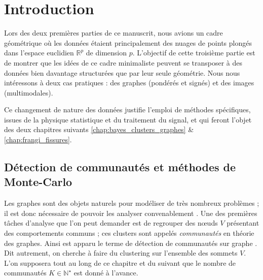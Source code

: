 \chapter{Introduction}
\label{chap:introduction_partie_III}

Lors des deux premières parties de ce manuscrit, nous avions un cadre géométrique où les données étaient principalement des nuages de points plongés dans l'espace euclidien $\mathbb R^p$ de dimension $p$. 
L'objectif de cette troisième partie est de montrer que les idées de ce cadre minimaliste peuvent se transposer à des données bien davantage structurées que par leur seule géométrie.
Nous nous intéressons à deux cas pratiques : des graphes (pondérés et signés) et des images (multimodales). 

Ce changement de nature des données justifie l'emploi de méthodes spécifiques, issues de la physique statistique et du traitement du signal, et qui feront l'objet des deux chapitres suivants \ref{chap:bayes_clusters_graphes} \& \ref{chap:frangi_fissures}.


\section{Détection de communautés et méthodes de Monte-Carlo}

Les graphes sont des objets naturels pour modéliser de très nombreux problèmes ; il est donc nécessaire de pouvoir les analyser convenablement \cite{AvrachenkovDreveton2022}.
Une des premières tâches d'analyse que l'on peut demander est de regrouper des nœuds $V$ présentant des comportements communs ; ces clusters sont appelés \textit{communautés} en théorie des graphes. Ainsi est apparu le terme de détection de communautés sur graphe \cite{Fortunato2010}.
Dit autrement, on cherche à faire du clustering sur l'ensemble des sommets $V$.
L'on supposera tout au long de ce chapitre et du suivant que le nombre de communautés $K \in \mathbb N^\star$ est donné à l'avance.




